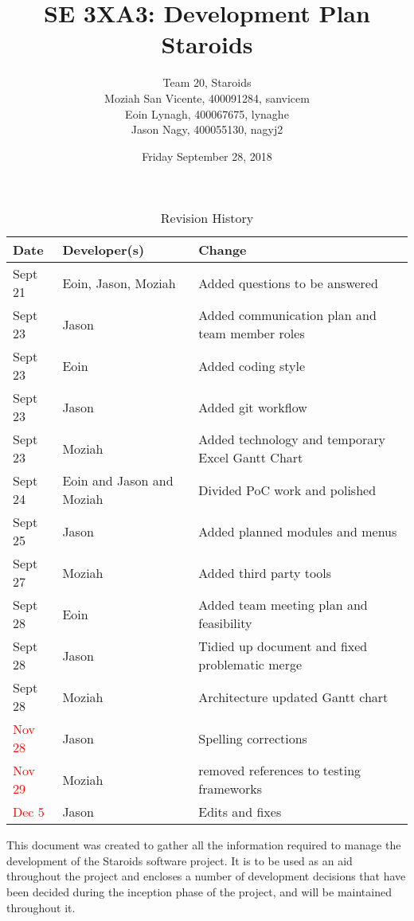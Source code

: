\documentclass{article}
\title{SE 3XA3: Development Plan\\Staroids}
\author{Team 20, Staroids
		\\ Moziah San Vicente, 400091284, sanvicem
		\\ Eoin Lynagh, 400067675, lynaghe
		\\ Jason Nagy, 400055130, nagyj2
}
\date{Friday September 28, 2018}
\begin{document}
\begin{table}[hp]
\caption{Revision History} \label{TblRevisionHistory}
\begin{tabularx}{\textwidth}{llX}
\toprule
\textbf{Date} & \textbf{Developer(s)} & \textbf{Change}\\
\midrule
Sept 21 & Eoin, Jason, Moziah & Added questions to be answered\\
Sept 23 & Jason & Added communication plan and team member roles\\
Sept 23 & Eoin & Added coding style\\
Sept 23 & Jason & Added git workflow\\
Sept 23 & Moziah & Added technology and temporary Excel Gantt Chart\\
Sept 24 & Eoin and Jason and Moziah & Divided PoC work and polished\\
Sept 25 & Jason & Added planned modules and menus\\
Sept 27 & Moziah & Added third party tools\\
Sept 28 & Eoin & Added team meeting plan and feasibility\\
Sept 28 & Jason & Tidied up document and fixed problematic merge\\
Sept 28 & Moziah & Architecture updated Gantt chart\\
\textcolor{red}{Nov 28} & Jason & Spelling corrections\\
\textcolor{red}{Nov 29} & Moziah & removed references to testing frameworks\\
\textcolor{red}{Dec 5} & Jason & Edits and fixes\\
\bottomrule
\end{tabularx}
\end{table}

\newpage

\maketitle

This document was created to gather all the information required to manage the development of the Staroids software project. It is to be used as an aid throughout the project and encloses a number of development decisions that have been decided during the inception phase of the project, and will be maintained throughout it.
\end{document}
